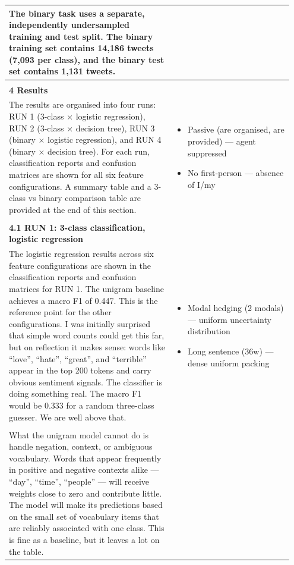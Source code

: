\documentclass[11pt]{article}
\begin{document}
\begin{longtable}{|p{0.55\linewidth}|p{0.40\linewidth}|}
\hline
The binary task uses a separate, independently undersampled training and test split. The binary training set contains 14,186 tweets (7,093 per class), and the binary test set contains 1,131 tweets. &  \\[2pt]
\hline
\rule[-3.5cm]{0pt}{3.5cm} & \\
\hline
\textbf{4 Results}\\[4pt]
The results are organised into four runs: RUN 1 (3-class × logistic regression), RUN 2 (3-class × decision tree), RUN 3 (binary × logistic regression), and RUN 4 (binary × decision tree). For each run, classification reports and confusion matrices are shown for all six feature configurations. A summary table and a 3-class vs binary comparison table are provided at the end of this section. & \begin{itemize}[leftmargin=1em,itemsep=1pt,topsep=1pt,parsep=0pt]
  \item Passive (are organised, are provided) --- agent suppressed
  \item No first-person --- absence of I/my
\end{itemize} \\[2pt]
\hline
\rule[-3.5cm]{0pt}{3.5cm} & \\
\hline
\textbf{4.1 RUN 1: 3-class classification, logistic regression}\\[4pt]
The logistic regression results across six feature configurations are shown in the classification reports and confusion matrices for RUN 1. The unigram baseline achieves a macro F1 of 0.447. This is the reference point for the other configurations. I was initially surprised that simple word counts could get this far, but on reflection it makes sense: words like ``love'', ``hate'', ``great'', and ``terrible'' appear in the top 200 tokens and carry obvious sentiment signals. The classifier is doing something real. The macro F1 would be 0.333 for a random three-class guesser. We are well above that. & \begin{itemize}[leftmargin=1em,itemsep=1pt,topsep=1pt,parsep=0pt]
  \item Modal hedging (2 modals) --- uniform uncertainty distribution
  \item Long sentence (36w) --- dense uniform packing
\end{itemize} \\[2pt]
\hline
\rule[-3.5cm]{0pt}{3.5cm} & \\
\hline
What the unigram model cannot do is handle negation, context, or ambiguous vocabulary. Words that appear frequently in positive and negative contexts alike --- ``day'', ``time'', ``people'' --- will receive weights close to zero and contribute little. The model will make its predictions based on the small set of vocabulary items that are reliably associated with one class. This is fine as a baseline, but it leaves a lot on the table. & \begin{itemize}[leftmargin=1em,itemsep=1pt,topsep=1pt,parsep=0pt]

\end{itemize}
\end{longtable}
\end{document}
